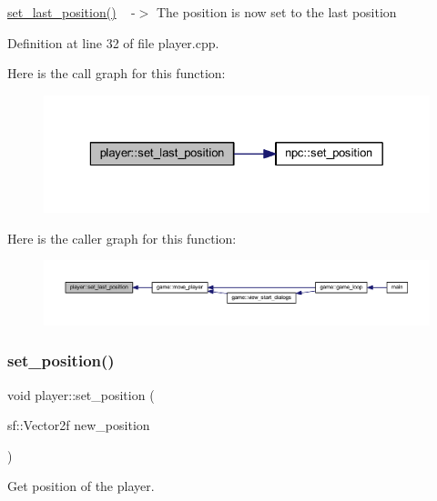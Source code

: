 \hyperlink{classplayer_a3bf8cc80800146684a3dbf28c0c4a83c}{set\+\_\+last\+\_\+position()} ~\newline
 -\/$>$ The position is now set to the last position 

Definition at line 32 of file player.\+cpp.

Here is the call graph for this function\+:
\nopagebreak
\begin{figure}[H]
\begin{center}
\leavevmode
\includegraphics[width=329pt]{classplayer_a3bf8cc80800146684a3dbf28c0c4a83c_cgraph}
\end{center}
\end{figure}
Here is the caller graph for this function\+:
\nopagebreak
\begin{figure}[H]
\begin{center}
\leavevmode
\includegraphics[width=350pt]{classplayer_a3bf8cc80800146684a3dbf28c0c4a83c_icgraph}
\end{center}
\end{figure}
\mbox{\label{classplayer_a17ee5122ab15251afb54b4cdd42060e6}} 
\subsubsection{\texorpdfstring{set\+\_\+position()}{set\_position()}}
{\footnotesize\ttfamily void player\+::set\+\_\+position (\begin{DoxyParamCaption}\item[{sf\+::\+Vector2f}]{new\+\_\+position }\end{DoxyParamCaption})}



Get position of the player. 

